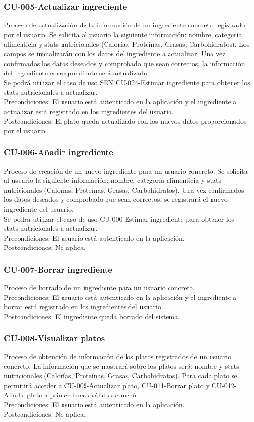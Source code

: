 \documentclass[12pt, a4paper, twoside]{book}
\begin{document}
	\subsubsection{CU-005-Actualizar ingrediente}
	Proceso de actualización de la información de un ingrediente concreto registrado por el usuario.
	Se solicita al usuario la siguiente información: nombre, categoría alimenticia y stats nutricionales (Calorías, Proteínas, Grasas, Carbohidratos).
	Los campos se inicializarán con los datos del ingrediente a actualizar.
	Una vez confirmados los datos deseados y comprobado que sean correctos, la información del ingrediente correspondiente será actualizada.\\ 
	Se podrá utilizar el caso de uso SEN CU-024-Estimar ingrediente para obtener los stats nutricionales a actualizar.\\
	Precondiciones: El usuario está autenticado en la aplicación y el ingrediente a actualizar está registrado en los ingredientes del usuario.\\
	Postcondiciones: El plato queda actualizado con los nuevos datos proporcionados por el usuario.
	\subsubsection{CU-006-Añadir ingrediente}
	Proceso de creación de un nuevo ingrediente para un usuario concreto.
	Se solicita al usuario la siguiente información: nombre, categoría alimenticia y stats nutricionales (Calorías, Proteínas, Grasas, Carbohidratos).
	Una vez confirmados los datos deseados y comprobado que sean correctos, se registrará el nuevo ingrediente del usuario.\\ 
	Se podrá utilizar el caso de uso CU-000-Estimar ingrediente para obtener los stats nutricionales a actualizar.\\
	Precondiciones: El usuario está autenticado en la aplicación.\\
	Postcondiciones: No aplica.
	\subsubsection{CU-007-Borrar ingrediente}
	Proceso de borrado de un ingrediente para un usuario concreto.\\
	Precondiciones: El usuario está autenticado en la aplicación y el ingrediente a borrar está registrado en los ingredientes del usuario.\\
	Postcondiciones: El ingrediente queda borrado del sistema.
	\subsubsection{CU-008-Visualizar platos}
	Proceso de obtención de información de los platos registrados de un usuario concreto. La información que se mostrará sobre los platos será: nombre y stats nutricionales (Calorías, Proteínas, Grasas, Carbohidratos).
	Para cada plato se permitirá acceder a CU-009-Actualizar plato, CU-011-Borrar plato y CU-012-Añadir plato a primer hueco válido de menú.\\
	Precondiciones: El usuario está autenticado en la aplicación.\\
	Postcondiciones: No aplica.
\end{document}
